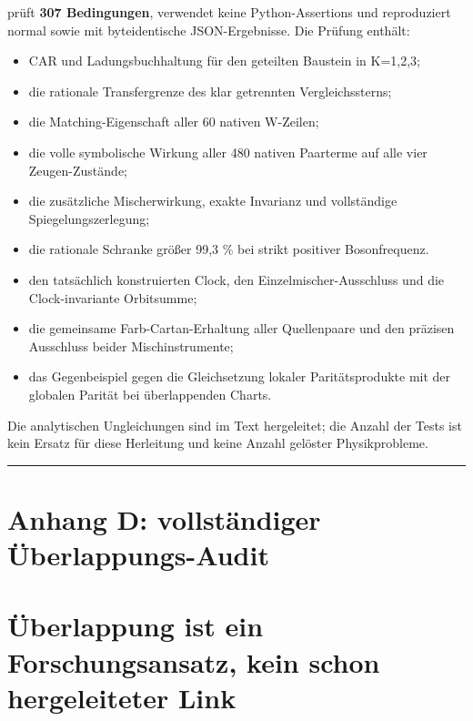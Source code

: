  prüft \textbf{307 Bedingungen}, verwendet keine
Python-Assertions und reproduziert normal sowie mit 
byteidentische JSON-Ergebnisse. Die Prüfung enthält:

\begin{itemize}
\tightlist
\item
  CAR und Ladungsbuchhaltung für den geteilten Baustein in K=1,2,3;
\item
  die rationale Transfergrenze des klar getrennten Vergleichssterns;
\item
  die Matching-Eigenschaft aller 60 nativen W-Zeilen;
\item
  die volle symbolische Wirkung aller 480 nativen Paarterme auf alle
  vier Zeugen-Zustände;
\item
  die zusätzliche Mischerwirkung, exakte Invarianz und vollständige
  Spiegelungszerlegung;
\item
  die rationale Schranke größer 99,3 \% bei strikt positiver
  Bosonfrequenz.
\item
  den tatsächlich konstruierten Clock, den Einzelmischer-Ausschluss und
  die Clock-invariante Orbitsumme;
\item
  die gemeinsame Farb-Cartan-Erhaltung aller Quellenpaare und den
  präzisen Ausschluss beider Mischinstrumente;
\item
  das Gegenbeispiel gegen die Gleichsetzung lokaler Paritätsprodukte mit
  der globalen Parität bei überlappenden Charts.
\end{itemize}

Die analytischen Ungleichungen sind im Text hergeleitet; die Anzahl der
Tests ist kein Ersatz für diese Herleitung und keine Anzahl gelöster
Physikprobleme.

\begin{center}\rule{0.5\linewidth}{0.5pt}\end{center}

\section{Anhang D: vollständiger
Überlappungs-Audit}\label{anhang-d-vollstuxe4ndiger-uxfcberlappungs-audit}

\section{Überlappung ist ein Forschungsansatz, kein schon hergeleiteter
Link}\label{uxfcberlappung-ist-ein-forschungsansatz-kein-schon-hergeleiteter-link}

